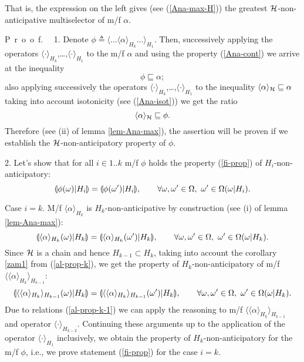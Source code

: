 \documentclass[sn-mathphys,Numbered,pdflatex]{sn-jnl}%
\theoremstyle{thmstyleone}%
\theoremstyle{thmstyletwo}%
\theoremstyle{thmstylethree}%
\renewcommand{\proof}{\par\mbox{P r o o f.}\ \ }
\newcommand{\nint}[2]{{{#1}..{#2}}}%
\newcommand{\beq}{\begin{equation}}
\newcommand{\eeq}{\end{equation}}
\newcommand{\mydef}{\mathrel{\triangleq}}%
\newcommand{\res}[2]{\ensuremath{(#1|#2)}}%
\newcommand{\myLe}{\mathrel{\sqsubseteq}}%
\newcommand{\naOm}{\ensuremath{\Omega}}%
\newcommand{\naOmo}[2]{\naOm\setbox0=\hbox{\text{$#1$}}\ifdim\wd0=0pt\else\res{#1}{#2}\fi}%
\newcommand{\sres}[2]{\llparenthesis#1|#2\rrparenthesis}%
\newcommand{\Ana}[2]{\ensuremath{\langle{#1}\rangle_{#2}}}%
\newcommand{\fref}[1]{{\rm(\ref{#1})}}   %
\begin{document}
That is, the expression on the left gives (see \fref{Ana-max-H}) the greatest ${\cal H}$-non-anticipative multiselector of m/f $\alpha$.

\proof
1.
Denote $\phi\mydef\Ana{\ldots\Ana\alpha{H_k}\ldots}{H_1}$.
Then, successively applying the operators $\Ana\cdot{H_k}$,\ldots,$\Ana\cdot{H_1}$ to the m/f $\alpha$ and using the property \fref{Ana-cont} we arrive at the inequality
\beq\label{fi-in-al}
\phi\myLe\alpha;
\eeq
also applying successively the operators $\Ana\cdot{H_k}$,\ldots,$\Ana\cdot{H_1}$ to the inequality $\Ana\alpha{\cal H}\myLe\alpha$ taking into account isotonicity (see \fref{Ana-isot}) we get the ratio
\beq\label{ana-al-le-bet}
\Ana\alpha{\cal H}\myLe\phi.
\eeq
Therefore (see (ii) of lemma  \ref{lem-Ana-max}), the assertion will be proven if we establish the ${\cal H}$-non-anticipatory property of $\phi$.

2.
Let's show that for all $i\in\nint1k$ m/f $\phi$ holds the property \fref{fi-prop} of $H_i$-non-anticipatory:
\beq\label{fi-prop}
\sres{\phi(\omega)}{H_i}=\sres{\phi(\omega')}{H_i}, \qquad\forall \omega,\omega'\in\naOm,\ \omega'\in \naOmo{\omega}{H_i}.
\eeq

Case $i=k$.
M/f $\Ana{\alpha}{H_k}$ is $H_k$-non-anticipative by construction (see (i) of lemma \ref{lem-Ana-max}):
\beq\label{al-prop-k}
\sres{\Ana\alpha{H_k}(\omega)}{H_k}=\sres{\Ana\alpha{H_k}(\omega')}{H_k},\qquad\forall \omega,\omega'\in\naOm,\ \omega'\in\naOmo{\omega}{H_k}.
\eeq
Since ${\cal H}$ is a chain and hence $H_{k-1}\subset H_k$, taking into account the corollary \ref{zam1} from \fref{al-prop-k}, we get the property of $H_k$-non-anticipatory of m/f $\Ana{\Ana\alpha{H_k}}{H_{k-1}}$:
\beq\label{al-prop-k-1}
\sres{\Ana{\Ana\alpha{H_k}}{H_{k-1}}(\omega)}{H_k}=\sres{\Ana{\Ana\alpha{H_k}}{H_{k- 1}}(\omega')}{H_k},\qquad\forall \omega,\omega'\in\naOm,\ \omega'\in\naOmo{\omega}{H_k}.
\eeq
Due to relations \fref{al-prop-k-1} we can apply the reasoning to m/f $\Ana{\Ana\alpha{H_k}}{H_{k-1}}$ and operator $\Ana{\cdot}{H_{k-2}}$.
Continuing these arguments up to the application of the operator $\Ana{\cdot}{H_1}$ inclusively, we obtain the property of $H_k$-non-anticipatory for the m/f $\phi$, i.e., we prove statement \fref{fi-prop} for the case $i=k$.
\end{document}
